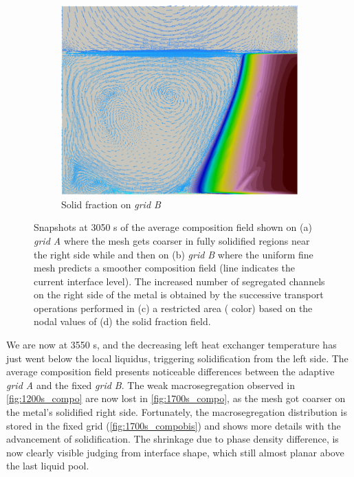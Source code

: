 \begin{figure}[htbp]
\begin{subfigure}[t]{0.4\textwidth}
  \includegraphics[width=\textwidth]{Chapter5/Graphics/2d/1200s_gs_vl.png}
  \caption{Solid fraction on \emph{grid B}}
    \label{fig:1200s_gs}
  \end{subfigure}
\caption{Snapshots at 3050 s of the average composition field shown on (a) \emph{grid A} where the mesh gets coarser in fully solidified regions near the right side while
and then on (b) \emph{grid B} where the uniform fine mesh predicts a smoother composition field (line indicates the current interface level). 
The increased number of segregated channels on the right side of the
metal is obtained by the successive transport operations performed in (c) a restricted area ( color) based on the nodal values of (d) the solid fraction field.}
\label{fig:W_mask_1200s}
\end{figure}


We are now at 3550 s, and the decreasing left heat exchanger temperature has just went below the local liquidus, 
triggering solidification from the left side.
The average composition field presents noticeable differences between the adaptive \emph{grid A} and the fixed \emph{grid B}.
The weak macrosegregation observed in \cref{fig:1200s_compo} are now lost in \cref{fig:1700s_compo}, as the mesh got coarser on the metal's solidified right
side. Fortunately, the macrosegregation distribution is stored in the fixed grid (\cref{fig:1700s_compobis}) and shows more details with the advancement of solidification. 
The shrinkage due to phase density difference, is now clearly visible judging from interface shape, which still almost planar above the last liquid pool. 

